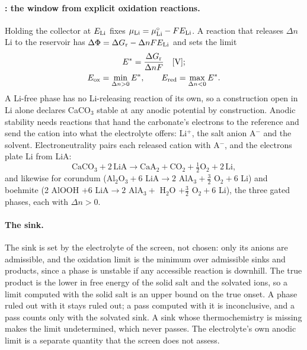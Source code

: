 \paragraph{\Rc: the window from explicit oxidation reactions.} Holding the collector at $E_\mathrm{Li}$ fixes
$\mu_\mathrm{Li}=\mu_\mathrm{Li}^{\circ}-FE_\mathrm{Li}$. A reaction that releases $\Delta n$ Li to the reservoir has
$\Delta\Phi=\Delta G_\mathrm{r}-\Delta nFE_\mathrm{Li}$ and sets the limit
\begin{equation}\label{thsi:eq:window}
\begin{gathered}
E^{*}=\frac{\Delta G_\mathrm{r}}{\Delta nF} \quad[\mathrm{V}];\\
E_\mathrm{ox}=\min_{\Delta n>0}E^{*},\qquad E_\mathrm{red}=\max_{\Delta n<0}E^{*}.
\end{gathered}
\end{equation}
A Li-free phase has no Li-releasing reaction of its own, so a construction open in Li alone declares
CaCO$_3$ stable at any anodic potential by construction. Anodic stability needs reactions that hand the
carbonate's electrons to the reference and send the cation into what the electrolyte offers: Li$^{+}$,
the salt anion A$^{-}$ and the solvent. Electroneutrality pairs each released cation with A$^{-}$, and
the electrons plate Li from LiA:
\begin{equation}\label{thsi:eq:sink}
\mathrm{CaCO_3}+2\,\mathrm{LiA}\to\mathrm{CaA_2}+\mathrm{CO_2}+\tfrac12\mathrm{O_2}+2\,\mathrm{Li},
\end{equation}
and likewise for corundum (Al$_2$O$_3+6$ LiA$\to2$ AlA$_3+\tfrac32$ O$_2+6$ Li) and boehmite (2 AlOOH
$+6$ LiA$\to2$ AlA$_3+$ H$_2$O $+\tfrac32$ O$_2+6$ Li), the three gated phases, each with $\Delta n>0$.

\paragraph{The sink.} The sink is set by the electrolyte of the screen, not chosen: only its anions are
admissible, and the oxidation limit is the minimum over admissible sinks and products, since a phase is
unstable if any accessible reaction is downhill. The true product is the lower in free energy of the
solid salt and the solvated ions, so a limit computed with the solid salt is an upper bound on the true
onset. A phase ruled out with it stays ruled out; a pass computed with it is inconclusive, and a pass
counts only with the solvated sink. A sink whose thermochemistry is missing makes the limit
undetermined, which never passes. The electrolyte's own anodic limit is a separate quantity that the
screen does not assess.

